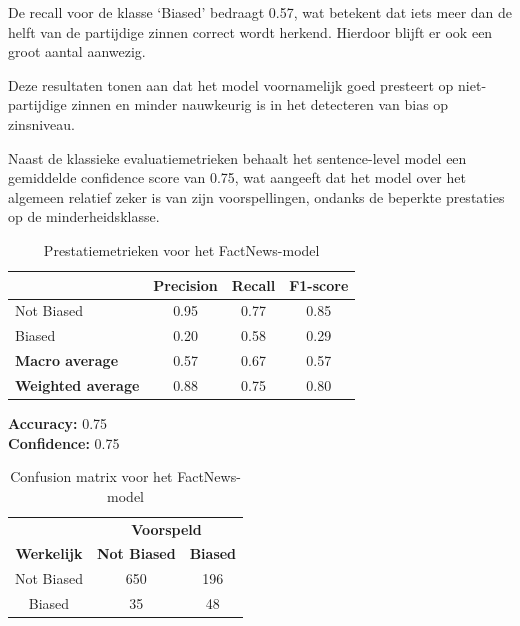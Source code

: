 De recall voor de klasse `Biased' bedraagt 0.57, wat betekent dat iets meer dan de helft van de partijdige zinnen correct wordt herkend. Hierdoor blijft er ook een groot aantal  aanwezig.

Deze resultaten tonen aan dat het model voornamelijk goed presteert op niet-par\-tijdige zinnen en minder nauwkeurig is in het detecteren van bias op zinsniveau.

Naast de klassieke evaluatiemetrieken behaalt het sentence-level model een gemiddelde confidence score van 0.75, wat aangeeft dat het model over het algemeen relatief zeker is van zijn voorspellingen, ondanks de beperkte prestaties op de minderheidsklasse.

\begin{table}
    \centering
    \begin{tabular}{lccc}
        & \textbf{Precision} & \textbf{Recall} & \textbf{F1-score} \\
        \hline
        Not Biased & 0.95 & 0.77 & 0.85 \\
        Biased & 0.20 & 0.58 & 0.29 \\
        \hline
        \textbf{Macro average} & 0.57 & 0.67 & 0.57 \\
        \textbf{Weighted average} & 0.88 & 0.75 & 0.80 \\
    \end{tabular}
    \vspace{0.2cm}
    
    \textbf{Accuracy:} 0.75 \\
    \textbf{Confidence:} 0.75 \\
    \caption{Prestatiemetrieken voor het FactNews-model}
    \label{tab:factnews-metrics}
\end{table}

\begin{table}
    \centering
    \begin{tabular}{c|cc}
        & \multicolumn{2}{c}{\textbf{Voorspeld}} \\
        \textbf{Werkelijk} & \textbf{Not Biased} & \textbf{Biased} \\
        \hline
        Not Biased & 650 & 196 \\
        Biased & 35 & 48 \\
    \end{tabular}
    \caption{Confusion matrix voor het FactNews-model}
    \label{tab:factnews-cm}
\end{table}

